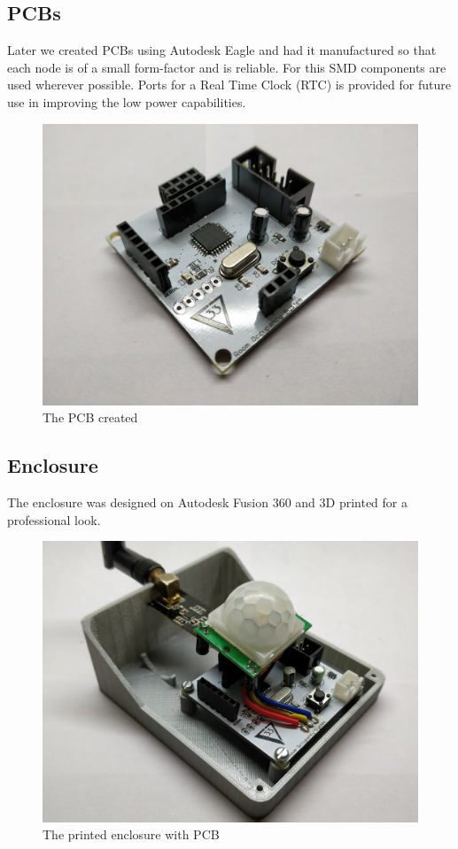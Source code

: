 \documentclass[journal]{IEEEtran}
\begin{document}
\subsection{PCBs}
Later we created PCBs using Autodesk Eagle and had it manufactured so that each node is of a small form-factor and is reliable. For this SMD components are used wherever possible. Ports for a Real Time Clock (RTC) is provided for future use in improving the low power capabilities.

\begin{figure}[ht]
	\centering
	\includegraphics[scale=0.05]{1__30_.jpg}
	\caption{The PCB created}
	\label{fig_pcb}
\end{figure}

\subsection{Enclosure}
The enclosure was designed on Autodesk Fusion 360 and 3D printed for a professional look.

\begin{figure}[ht]
	\centering
	\includegraphics[scale=0.05]{AssemPCB2.jpg}
	\caption{The printed enclosure with PCB}
	\label{fig_enclosure}
\end{figure}
\end{document}
